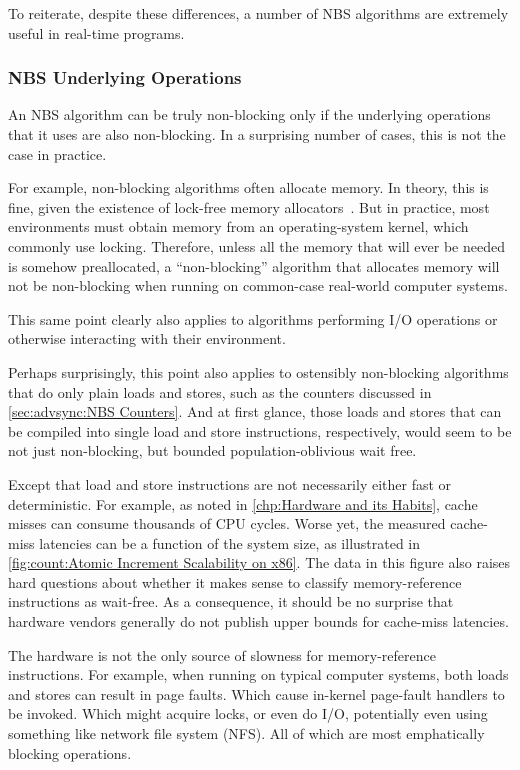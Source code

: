 To reiterate, despite these differences, a number of NBS algorithms are
extremely useful in real-time programs.

\subsubsection{NBS Underlying Operations}
\label{sec:advsync:NBS Underlying Operations}

An NBS algorithm can be truly non-blocking only if the underlying
operations that it uses are also non-blocking.
In a surprising number of cases, this is not the case in practice.

For example, non-blocking algorithms often allocate memory.
In theory, this is fine, given the existence of lock-free
memory allocators~\cite{MagedMichael04NBSmalloc}.
But in practice, most environments must obtain memory from an
operating-system kernel, which commonly use locking.
Therefore, unless all the memory that will ever be needed is somehow
preallocated, a ``non-blocking'' algorithm that allocates memory will not
be non-blocking when running on common-case real-world computer systems.

This same point clearly also applies to algorithms performing I/O
operations or otherwise interacting with their environment.

Perhaps surprisingly, this point also applies to ostensibly non-blocking
algorithms that do only plain loads and stores, such as the counters
discussed in \cref{sec:advsync:NBS Counters}.
And at first glance, those loads and stores that can be compiled into
single load and store instructions, respectively, would seem to be
not just non-blocking, but bounded population-oblivious wait free.

Except that load and store instructions are not necessarily either
fast or deterministic.
For example, as noted in \cref{chp:Hardware and its Habits}, cache misses
can consume thousands of CPU cycles.
Worse yet, the measured cache-miss latencies can be a function of the
system size, as illustrated in
\cref{fig:count:Atomic Increment Scalability on x86}.
The data in this figure also raises hard questions about whether it
makes sense to classify memory-reference instructions as wait-free.
As a consequence, it should be no surprise that hardware vendors generally
do not publish upper bounds for cache-miss latencies.

The hardware is not the only source of slowness for memory-reference
instructions.
For example, when running on typical computer systems, both loads and
stores can result in page faults.
Which cause in-kernel page-fault handlers to be invoked.
Which might acquire locks, or even do I/O, potentially even using
something like network file system (NFS).
All of which are most emphatically blocking operations.

